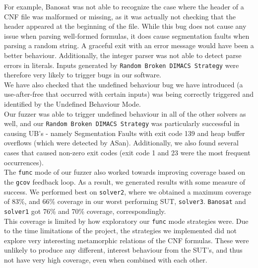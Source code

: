 \documentclass{article}
\begin{document}
For example, Banosat was not able to recognize the case where the header of a CNF file was malformed or missing,
as it was actually not checking that the header appeared at the beginning of the file. While this bug
does not cause any issue when parsing well-formed formulas, it does cause segmentation faults when parsing
a random string. A graceful exit with an error message would have been a better behaviour.
Additionally, the integer parser was not able to detect parse errors in literals. Inputs generated
by \verb|Random Broken DIMACS Strategy| were therefore very likely to trigger bugs in our software. \\

We have also checked that the undefined behaviour bug we have introduced (a use-after-free that occurred with certain
inputs) was being correctly triggered and identified by the Undefined Behaviour Mode. \\

Our fuzzer was able to trigger undefined behaviour in all of the other solvers as well, and our \texttt{Random Broken DIMACS Strategy} was particularly successful in causing UB's - namely Segmentation Faults with exit code 139 and heap buffer overflows (which were detected by ASan). Additionally, we also found several cases that caused non-zero exit codes (exit code 1 and 23 were the most frequent occurrences). \\

The \texttt{func} mode of our fuzzer also worked towards improving coverage based on the \texttt{gcov} feedback loop. As a result, we generated results with some measure of success. We performed best on \texttt{solver2}, where we obtained a maximum coverage of 83\%, and 66\% coverage in our worst performing SUT, \texttt{solver3}. \texttt{Banosat} and \texttt{solver1} got 76\% and 70\% coverage, correspondingly.  \\

This coverage is limited by how exploratory our \texttt{func} mode strategies were. Due to the time limitations of the project, the strategies we implemented did not explore very interesting metamorphic relations of the CNF formulas. These were unlikely to produce any different, interest behaviour from the SUT's, and thus not have very high coverage, even when combined with each other.
\end{document}
